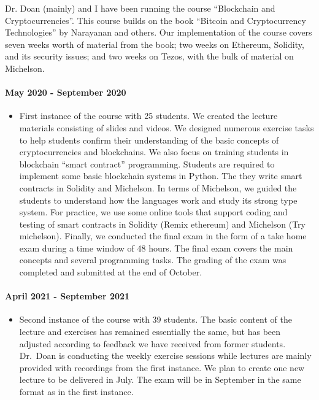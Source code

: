 \documentclass[a4paper,11pt]{article}
\begin{document}
Dr. Doan (mainly) and I have been running the course “Blockchain and Cryptocurrencies”. This course builds on the book “Bitcoin and Cryptocurrency Technologies” by Narayanan and others. Our implementation of the course covers seven weeks worth of material from the book; two weeks on Ethereum, Solidity, and its security issues; and two weeks on Tezos, with the bulk of material on Michelson. 
\paragraph{May 2020 - September 2020}
\begin{itemize}
\item First instance of the course with 25 students. We created the lecture materials consisting of slides and videos.  We designed numerous exercise tasks to help students confirm their understanding of the basic concepts of cryptocurrencies and blockchains. We also focus on training students in blockchain ``smart contract'' programming. Students are required to implement some basic blockchain systems in  Python. The they write smart contracts in Solidity and Michelson. In terms of Michelson, we guided the students to understand how the languages work and study its strong type system. For practice, we use some online tools that support coding and testing of smart contracts in Solidity (Remix ethereum) and Michelson (Try michelson). Finally, we conducted the final exam in the form of a take home exam during a time window of 48 hours. The final exam covers the main concepts and several programming tasks. The grading of the exam was completed and submitted at the end of October. 
\end{itemize}

\paragraph{April 2021 - September 2021}
\begin{itemize} 
\item Second instance of the course with 39 students. The basic content of the lecture and exercises has remained essentially the same, but has  been adjusted according to feedback we have received from former students. Dr.\ Doan is conducting the weekly exercise sessions while lectures are mainly provided with recordings from the first instance. We plan to create one new lecture to be delivered in July. The exam will be in September in the same format as in the first instance. 
\end{itemize}
\end{document}

